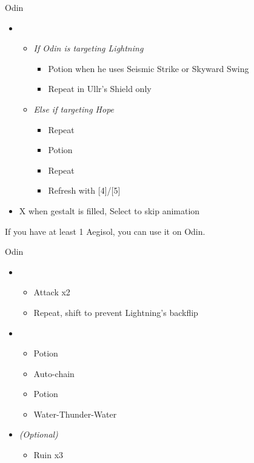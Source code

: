 \begin{paracol}{2}
\begin{battle}{Odin}
\begin{itemize}
			\item \fifth
			      \begin{itemize}
				      \item \textit{If Odin is targeting Lightning}
				            \begin{itemize}
					            \item Potion when he uses Seismic Strike or Skyward Swing
					            \item Repeat in Ullr's Shield only
				            \end{itemize}
				      \item \textit{Else if targeting Hope}
				            \begin{itemize}
					            \item Repeat
					            \item Potion
					            \item Repeat
					            \item Refresh with [4]/[5]
				            \end{itemize}
			      \end{itemize}
			\item X when gestalt is filled, Select to skip animation
		\end{itemize}
	\end{battle}
	\switchcolumn
	If you have at least 1 Aegisol, you can use it on Odin.
	\begin{battle}{Odin}
		\begin{itemize}
			\item \second
			      \begin{itemize}
				      \item Attack x2
				      \item Repeat, shift to prevent Lightning's backflip
			      \end{itemize}
			\item \fourth
			      \begin{itemize}
				      \item Potion
				      \item Auto-chain
				      \item Potion
				      \item Water-Thunder-Water
			      \end{itemize}
			\item \first \textit{(Optional)}
			      \begin{itemize}
				      \item Ruin x3
			      \end{itemize}

\end{itemize}
\end{battle}
\end{paracol}
